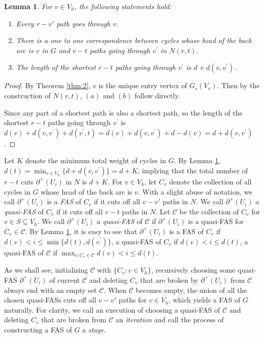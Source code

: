 \documentclass[11pt]{article}
\newtheorem{lemma}[theorem]{Lemma}
\begin{document}
\begin{lemma}
\label{lem:2}
For $v\in V_h$, the following statements hold:
\begin{enumerate}[label=\emph{(}\alph*\emph{)}]
  \item Every $r-v'$ path goes through $v$.
  \item There is a one to one correspondence between cycles whose head of the back arc is $v$ in $G$ and $v-t$ paths going through $v^\prime$ in $N(r,t)$. 
  \item The length of the shortest $r-t$ paths going through $v^\prime$ is $d+d(v,v^\prime)$.
\end{enumerate}
\end{lemma}
\begin{proof}
By Theorem \ref{thm:2}, $v$ is the unique entry vertex of $G_s(V_v)$. Then by the construction of $N(r,t)$, $(a)$ and $(b)$ follow directly.

Since any part of a shortest path is also a shortest path, so the length of the shortest $r-t$ paths going through $v^\prime$ is $d(v)+d(v,v^\prime)+d(v^\prime,t)=d(v)+d(v,v^\prime)+d-d(v)=d+d(v,v^\prime)$.
\end{proof}

Let $K$ denote the minimum total weight of cycles in $G$. By Lemma \ref{lem:2}, $d(t)=\min_{v\in V_h}\{d+d(v,v^\prime)\}=d+K$, implying that the total number of $r-t$ cuts $\partial^+(U_i)$ in $N$ is $d+K$.
For $v\in V_h$, let $C_v$ denote the collection of all cycles in $G$ whose head of the back arc is $v$. With a slight abuse of notation, we call $\partial^+(U_i)$ is a \emph{FAS} of $C_v$ if it cuts off all $v-v'$ paths in $N$. We call $\partial^+(U_i)$ a \emph{quasi-FAS} of $C_v$ if it cuts off all $v-t$ paths in $N$. Let $\mathcal{C}$ be the collection of $C_v$ for $v\in S\subseteq V_h$. We call $\partial^+(U_i)$ a \emph{quasi-FAS} of $\mathcal{C}$ if $\partial^+(U_i)$ is a quasi-FAS for $C_v\in\mathcal{C}$. By Lemma \ref{lem:2}, it is easy to see that $\partial^+(U_i)$ is a FAS of $C_v$ if $d(v)<i\leq \min\{d(t),d(v^\prime)\}$, a quasi-FAS of $C_v$ if $d(v) <i\leq d(t)$, a quasi-FAS of $\mathcal{C}$ if $\max_{v:C_v\in \mathcal{C}}d(v)<i\leq d(t)$.

 As we shall see, initializing $\mathcal{C}$ with $\{C_v: v\in V_h\}$, recursively choosing some quasi-FAS $\partial^+(U_i)$ of current $\mathcal{C}$ and deleting $C_v$ that are broken by $\partial^+(U_i)$ from $\mathcal{C}$ always end with an empty set $\mathcal{C}$.
 When $\mathcal{C}$ becomes empty, the union of all the chosen quasi-FASs cuts off all $v-v'$ paths for $v\in V_h$, which yields a FAS of $G$ naturally.
 For clarity, we call an execution of choosing a quasi-FAS of $\mathcal{C}$ and deleting $C_v$ that are broken from $\mathcal{C}$ an \emph{iteration} and call the process of constructing a FAS of $G$ a \emph{stage}.
\end{document}
